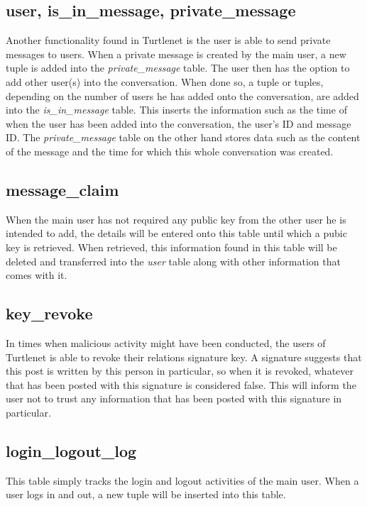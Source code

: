 \subsection{user, is\_in\_message, private\_message}
Another functionality found in Turtlenet is the user is able to send private messages to users. When a private message is created by the main user, a new tuple is added into the {\it private\_message} table. The user then has the option to add other user(s) into the conversation. When done so, a tuple or tuples, depending on the number of users he has added onto the conversation, are added into the {\it is\_in\_message} table. This inserts the information such as the time of when the user has been added into the conversation, the user's ID and message ID. The {\it private\_message} table on the other hand stores data such as the content of the message and the time for which this whole conversation was created. 

\subsection{message\_claim}
When the main user has not required any public key from the other user he is intended to add, the details will be entered onto this table until which a pubic key is retrieved. When retrieved, this information found in this table will be deleted and transferred into the {\it user} table along with other information that comes with it.

\subsection{key\_revoke}
In times when malicious activity might have been conducted, the users of Turtlenet is able to revoke their relations signature key. A signature suggests that this post is written by this person in particular, so when it is revoked, whatever that has been posted with this signature is considered false. This will inform the user not to trust any information that has been posted with this signature in particular. 

\subsection{login\_logout\_log}
This table simply tracks the login and logout activities of the main user. When a user logs in and out, a new tuple will be inserted into this table.

\clearpage

